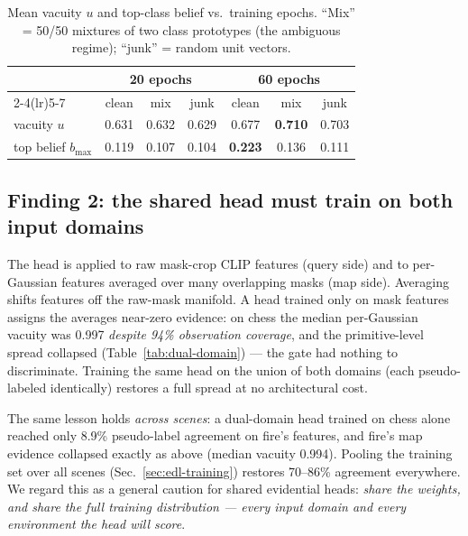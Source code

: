 \documentclass[journal]{IEEEtran}
\begin{document}
\begin{table}[t]
\caption{Mean vacuity $u$ and top-class belief vs.\ training epochs.
``Mix'' = 50/50 mixtures of two class prototypes (the ambiguous regime);
``junk'' = random unit vectors.}
\label{tab:edl-epochs}
\centering\footnotesize
\setlength{\tabcolsep}{3.5pt}
\begin{tabular}{@{}lcccccc@{}}
\toprule
& \multicolumn{3}{c}{20 epochs} & \multicolumn{3}{c}{60 epochs} \\
\cmidrule(lr){2-4}\cmidrule(lr){5-7}
& clean & mix & junk & clean & mix & junk \\
\midrule
vacuity $u$ & 0.631 & 0.632 & 0.629 & 0.677 & \textbf{0.710} & 0.703 \\
top belief $b_{\max}$ & 0.119 & 0.107 & 0.104 & \textbf{0.223} & 0.136 & 0.111 \\
\bottomrule
\end{tabular}
\end{table}

\subsection{Finding 2: the shared head must train on both input domains}
\label{sec:edl-domains}
The head is applied to raw mask-crop CLIP features (query side) and to
per-Gaussian features averaged over many overlapping masks (map side).
Averaging shifts features off the raw-mask manifold. A head trained only on
mask features assigns the averages near-zero evidence: on chess the median
per-Gaussian vacuity was 0.997 \emph{despite 94\% observation coverage}, and
the primitive-level spread collapsed (Table~\ref{tab:dual-domain}) --- the
gate had nothing to discriminate. Training the same head on the union of both
domains (each pseudo-labeled identically) restores a full spread at no
architectural cost.

The same lesson holds \emph{across scenes}: a dual-domain head trained on
chess alone reached only 8.9\% pseudo-label agreement on fire's features,
and fire's map evidence collapsed exactly as above (median vacuity 0.994).
Pooling the training set over all scenes (Sec.~\ref{sec:edl-training})
restores 70--86\% agreement everywhere. We regard this as a general caution
for shared evidential heads: \emph{share the weights, and share the full
training distribution --- every input domain and every environment the head
will score}.
\end{document}
